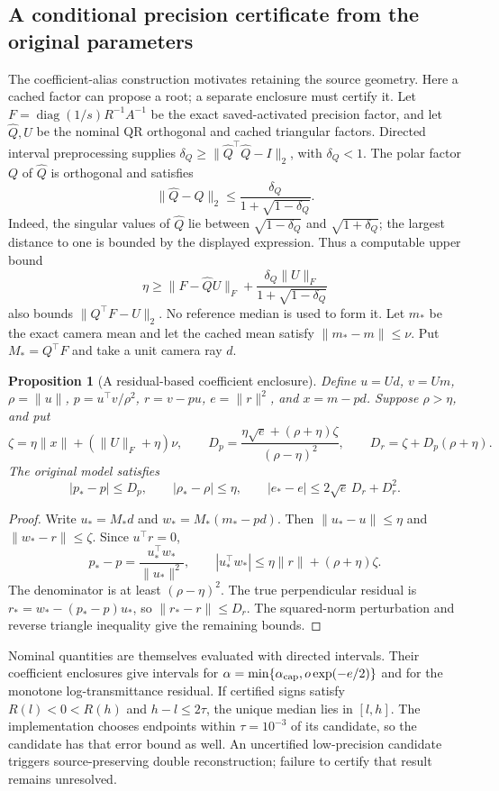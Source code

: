 \documentclass[11pt,a4paper]{article}
\newtheorem{proposition}[theorem]{Proposition}
\begin{document}
\subsection{A conditional precision certificate from the original parameters}

The coefficient-alias construction motivates retaining the source geometry.
Here a cached factor can propose a root; a separate enclosure must certify it.
Let $F=\operatorname{diag}(1/s)R^{-1}A^{-1}$ be the exact saved-activated
precision factor, and let $\widehat Q,U$ be the nominal QR orthogonal and
cached triangular factors. Directed interval preprocessing supplies
$\delta_Q\geq\|\widehat Q^\top\widehat Q-I\|_2$, with $\delta_Q<1$.
The polar factor $Q$ of $\widehat Q$ is orthogonal and satisfies
\[
 \|\widehat Q-Q\|_2\leq
 \frac{\delta_Q}{1+\sqrt{1-\delta_Q}}.
\]
Indeed, the singular values of $\widehat Q$ lie between
$\sqrt{1-\delta_Q}$ and $\sqrt{1+\delta_Q}$; the largest distance to one
is bounded by the displayed expression. Thus a computable upper bound
\[
 \eta\geq\|F-\widehat Q U\|_F+
 \frac{\delta_Q\|U\|_F}{1+\sqrt{1-\delta_Q}}
\]
also bounds $\|Q^\top F-U\|_2$. No reference median is used to form it.
Let $m_*$ be the exact camera mean and let the cached mean satisfy
$\|m_*-m\|\leq\nu$. Put $M_*=Q^\top F$ and take a unit camera ray $d$.

\begin{proposition}[A residual-based coefficient enclosure]
Define $u=Ud$, $v=Um$, $\rho=\|u\|$, $p=u^\top v/\rho^2$,
$r=v-pu$, $e=\|r\|^2$, and $x=m-pd$.
Suppose $\rho>\eta$, and put
\[
 \zeta=\eta\|x\|+(\|U\|_F+\eta)\nu,
 \qquad
 D_p=\frac{\eta\sqrt e+(\rho+\eta)\zeta}{(\rho-\eta)^2},
 \qquad D_r=\zeta+D_p(\rho+\eta).
\]
The original model satisfies
\[
 |p_*-p|\leq D_p,\qquad |\rho_*-\rho|\leq\eta,
 \qquad |e_*-e|\leq2\sqrt e\,D_r+D_r^2.
\]
\end{proposition}
\begin{proof}
Write $u_*=M_*d$ and $w_*=M_*(m_*-pd)$. Then
$\|u_*-u\|\leq\eta$ and $\|w_*-r\|\leq\zeta$.
Since $u^\top r=0$,
\[
 p_*-p=\frac{u_*^\top w_*}{\|u_*\|^2},\qquad
 |u_*^\top w_*|\leq\eta\|r\|+(\rho+\eta)\zeta.
\]
The denominator is at least $(\rho-\eta)^2$.
The true perpendicular residual is $r_*=w_*-(p_*-p)u_*$, so
$\|r_*-r\|\leq D_r$. The squared-norm perturbation and reverse triangle
inequality give the remaining bounds.
\end{proof}

Nominal quantities are themselves evaluated with directed intervals.
Their coefficient enclosures give intervals for
$\alpha=\min\{\alpha_{\rm cap},o\exp(-e/2)\}$ and for the monotone
log-transmittance residual. If certified signs satisfy
$R(l)<0<R(h)$ and $h-l\leq2\tau$, the unique median lies in $[l,h]$.
The implementation chooses endpoints within $\tau=10^{-3}$ of its
candidate, so the candidate has that error bound as well.
An uncertified low-precision candidate triggers source-preserving
double reconstruction; failure to certify that result remains unresolved.
\end{document}
